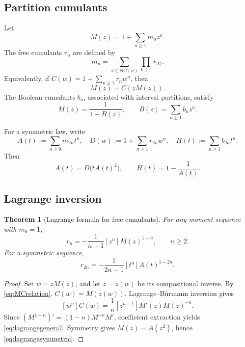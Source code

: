 \documentclass[11pt,oneside]{article}
\newtheorem{theorem}{Theorem}[section]
\theoremstyle{definition}
\theoremstyle{remark}
\begin{document}
\subsection{Partition cumulants}
Let
\[
M(z)=1+\sum_{n\ge1}m_nz^n.
\]
The free cumulants \(r_n\) are defined by
\begin{equation}\label{eq:NCmoment}
m_n=\sum_{\pi\in\mathrm{NC}(n)}\prod_{V\in\pi}r_{|V|}.
\end{equation}
Equivalently, if \(C(w)=1+\sum_{n\ge1}r_nw^n\), then
\begin{equation}\label{eq:MCrelation}
M(z)=C(zM(z)).
\end{equation}
The Boolean cumulants \(b_n\), associated with interval partitions, satisfy
\begin{equation}\label{eq:booleanrelation}
M(z)=\frac{1}{1-B(z)},\qquad B(z)=\sum_{n\ge1}b_nz^n.
\end{equation}

For a symmetric law, write
\begin{equation}\label{eq:Adef}
A(t):=\sum_{n\ge0}m_{2n}t^n,
\quad D(w):=1+\sum_{n\ge1}r_{2n}w^n,
\quad H(t):=\sum_{n\ge1}b_{2n}t^n.
\end{equation}
Then
\begin{equation}\label{eq:compressedrelations}
A(t)=D\bigl(tA(t)^2\bigr),
\qquad H(t)=1-\frac1{A(t)}.
\end{equation}

\subsection{Lagrange inversion}
\begin{theorem}[Lagrange formula for free cumulants]\label{thm:lagrangefree}
For any moment sequence with \(m_0=1\),
\begin{equation}\label{eq:lagrangegeneral}
r_n=-\frac1{n-1}[z^n]M(z)^{1-n},\qquad n\ge2.
\end{equation}
For a symmetric sequence,
\begin{equation}\label{eq:lagrangesymmetric}
r_{2n}=-\frac1{2n-1}[t^n]A(t)^{1-2n}.
\end{equation}
\end{theorem}
\begin{proof}
Set \(w=zM(z)\), and let \(z=z(w)\) be its compositional inverse. By \eqref{eq:MCrelation}, \(C(w)=M(z(w))\). Lagrange--B\"urmann inversion gives
\[
[w^n]C(w)=\frac1n[z^{n-1}]M'(z)M(z)^{-n}.
\]
Since \((M^{1-n})'=(1-n)M^{-n}M'\), coefficient extraction yields \eqref{eq:lagrangegeneral}. Symmetry gives \(M(z)=A(z^2)\), hence \eqref{eq:lagrangesymmetric}.
\end{proof}
\end{document}

